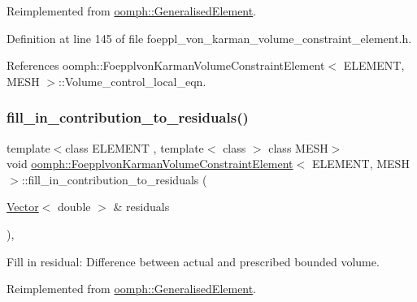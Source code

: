 Reimplemented from \hyperlink{classoomph_1_1GeneralisedElement_a6ae09fc0d68e4309ac1b03583d252845}{oomph\+::\+Generalised\+Element}.



Definition at line 145 of file foeppl\+\_\+von\+\_\+karman\+\_\+volume\+\_\+constraint\+\_\+element.\+h.



References oomph\+::\+Foepplvon\+Karman\+Volume\+Constraint\+Element$<$ E\+L\+E\+M\+E\+N\+T, M\+E\+S\+H $>$\+::\+Volume\+\_\+control\+\_\+local\+\_\+eqn.

\mbox{\label{classoomph_1_1FoepplvonKarmanVolumeConstraintElement_a670a824ff37ac6b77f9230184f4bb9f4}} 
\subsubsection{\texorpdfstring{fill\+\_\+in\+\_\+contribution\+\_\+to\+\_\+residuals()}{fill\_in\_contribution\_to\_residuals()}}
{\footnotesize\ttfamily template$<$class E\+L\+E\+M\+E\+NT , template$<$ class $>$ class M\+E\+SH$>$ \\
void \hyperlink{classoomph_1_1FoepplvonKarmanVolumeConstraintElement}{oomph\+::\+Foepplvon\+Karman\+Volume\+Constraint\+Element}$<$ E\+L\+E\+M\+E\+NT, M\+E\+SH $>$\+::fill\+\_\+in\+\_\+contribution\+\_\+to\+\_\+residuals (\begin{DoxyParamCaption}\item[{\hyperlink{classoomph_1_1Vector}{Vector}$<$ double $>$ \&}]{residuals }\end{DoxyParamCaption})\hspace{0.3cm}{\ttfamily [inline]}, {\ttfamily [virtual]}}



Fill in residual\+: Difference between actual and prescribed bounded volume. 



Reimplemented from \hyperlink{classoomph_1_1GeneralisedElement_a310c97f515e8504a48179c0e72c550d7}{oomph\+::\+Generalised\+Element}.



